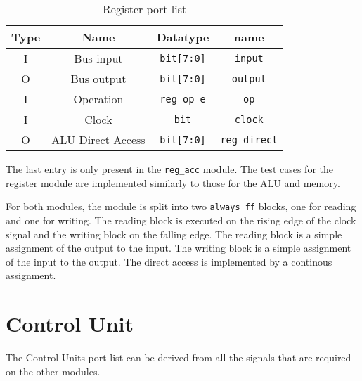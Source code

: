 \begin{table}[H]
  
  \begin{center}
  \begin{tabular}{cccc}
   Type & Name               & Datatype                       & name                          \\ \hline
   I    & Bus input          & \texttt{bit{[}7:0{]}}          & \texttt{input}                \\
   O    & Bus output         & \texttt{bit{[}7:0{]}}          & \texttt{output}               \\
   I    & Operation          & \texttt{reg\_op\_e}         & \texttt{op}                   \\
   I    & Clock              & \texttt{bit}                   & \texttt{clock}               \\
   O    & ALU Direct Access               & \texttt{bit{[}7:0{]}}          & \texttt{reg\_direct}               \\
   \end{tabular}
  \end{center}
   \caption{Register port list}
   \label{tab:reg-io}
\end{table}

The last entry is only present in the \texttt{reg\_acc} module. The test cases for the register module are implemented similarly to those for the ALU and memory. 

For both modules, the module is split into two \texttt{always\_ff} blocks, one for reading and one for writing. The reading block is executed on the rising edge of the clock signal and the writing block on the falling edge. The reading block is a simple assignment of the output to the input. The writing block is a simple assignment of the input to the output. The direct access is implemented by a continous assignment.


\section{Control Unit}
The Control Units port list can be derived from all the signals that are required on the other modules. 

